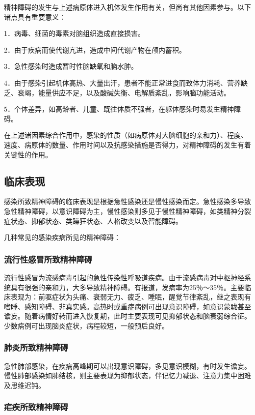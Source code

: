 精神障碍的发生与上述病原体进入机体发生作用有关，但尚有其他因素参与。以下诸点具有重要意义：

1．病毒、细菌的毒素对脑组织造成直接损害。

2．由于疾病而使代谢亢进，造成中间代谢产物在颅内蓄积。

3．急性感染时造成暂时性脑缺氧和脑水肿。

4．由于感染引起机体高热、大量出汗，患者不能正常进食而致体力消耗、营养缺乏、衰竭，能量供应不足，以及酸碱失衡、电解质紊乱，影响脑功能活动。

5．个体差异，如高龄者、儿童、既往体质不强者，在躯体感染时易发生精神障碍。

在上述诸因素综合作用中，感染的性质（如病原体对大脑细胞的亲和力）、程度、速度、病原体的数量、作用时间以及抗感染措施是否得力，对精神障碍的发生有着关键性的作用。

\subsection{临床表现}

感染所致精神障碍的临床表现是根据急性感染还是慢性感染而定。急性感染多导致急性精神障碍，以意识障碍为主，慢性感染则多见于慢性精神障碍，如类精神分裂症状态、抑郁状态、类躁狂状态、人格改变以及智能障碍。

几种常见的感染疾病所见的精神障碍：

\subsubsection{流行性感冒所致精神障碍}

流行性感冒为流感病毒引起的急性传染性呼吸道疾病。由于流感病毒对中枢神经系统具有很强的亲和力，大多导致精神障碍。有报道，发病率为25％～35％。主要临床表现为：前驱症状为头痛、衰弱无力、疲乏、睡眠，醒觉节律紊乱，继之表现有嗜睡、感知障碍、非真实感。高热时或重症病例可出现意识障碍，如意识蒙眬甚至谵妄。随着病情好转而进入恢复期，此时主要表现可见抑郁状态和脑衰弱综合征。少数病例可出现脑炎症状，病程较短，一般预后良好。

\subsubsection{肺炎所致精神障碍}

急性肺部感染，在疾病高峰期可以出现意识障碍，多见意识模糊，有时发生谵妄。慢性肺部感染如肺结核，则主要表现为抑郁状态，伴记忆力减退、注意力集中困难及思维迟钝。

\subsubsection{疟疾所致精神障碍}

